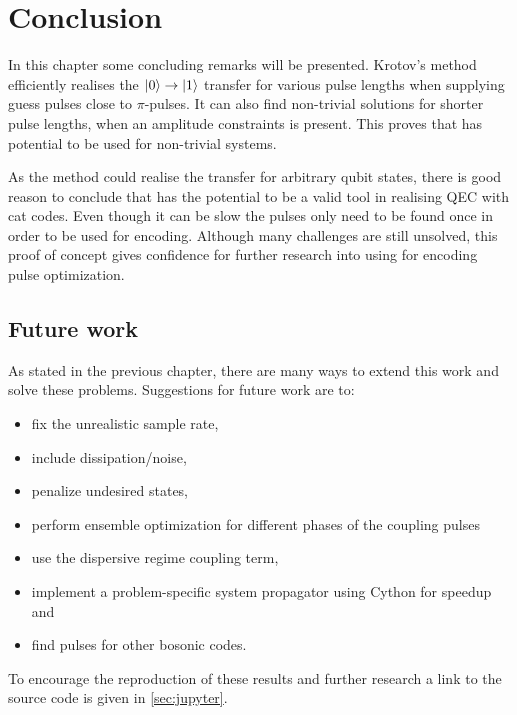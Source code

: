 \documentclass[main.tex]{subfiles}
\begin{document}
\chapter{Conclusion}
In this chapter some concluding remarks will be presented.
Krotov's method efficiently realises the \(\ket{0}\rightarrow\ket{1}\) transfer for various pulse lengths when supplying guess pulses close to \(\pi\)-pulses.
It can also find non-trivial solutions for shorter pulse lengths, when an amplitude constraints is present.
This proves that \krotov{} has potential to be used for non-trivial systems.

As the method could realise the transfer for arbitrary qubit states, there is good reason to conclude that \krotov{} has the potential to be a valid tool in realising QEC with cat codes.
Even though it can be slow the pulses only need to be found once in order to be used for encoding.
Although many challenges are still unsolved, this proof of concept gives confidence for further research into using \krotov{} for encoding pulse optimization.

\section{Future work}
\label{sec:future-work}
As stated in the previous chapter, there are many ways to extend this work and solve these problems.
Suggestions for future work are to:
\begin{itemize}
    \item fix the unrealistic sample rate,
    \item include dissipation/noise,
    \item penalize undesired states,
    \item perform ensemble optimization for different phases of the coupling pulses
    \item use the dispersive regime coupling term,
    \item implement a problem-specific system propagator using Cython for speedup and
    \item find pulses for other bosonic codes.
\end{itemize}
To encourage the reproduction of these results and further research a link to the source code is given in \cref{sec:jupyter}.
\end{document}
